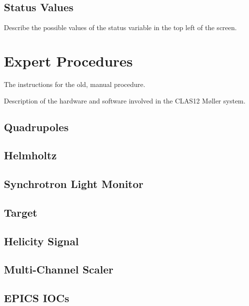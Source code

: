 \documentclass[amsmath,amssymb,notitlepage,11pt]{revtex4}
\begin{document}
\subsection{Status Values}
Describe the possible values of the status variable in the top left of the screen.

\section{Expert Procedures}\label{sec:expert}
The instructions for the old, manual procedure.

\begin{appendices}
Description of the hardware and software involved in the CLAS12 M{\o}ller system.
\subsection{Quadrupoles}
\subsection{Helmholtz}
\subsection{Synchrotron Light Monitor}
\subsection{Target}
\subsection{Helicity Signal}
\subsection{Multi-Channel Scaler}
\subsection{EPICS IOCs}
\end{appendices}
\end{document}
